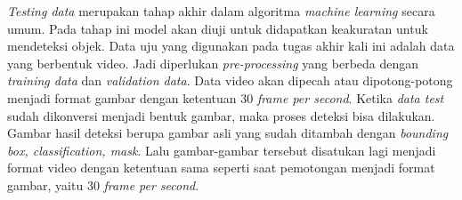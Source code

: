\textit{Testing data} merupakan tahap akhir dalam algoritma \textit{machine learning} secara umum. Pada tahap ini model akan diuji untuk didapatkan keakuratan untuk mendeteksi objek. Data uju yang digunakan pada tugas akhir kali ini adalah data yang berbentuk video. Jadi diperlukan \textit{pre-processing} yang berbeda dengan \textit{training data} dan \textit{validation data}. Data video akan dipecah atau dipotong-potong menjadi format gambar dengan ketentuan 30 \textit{frame per second}. Ketika \textit{data test} sudah dikonversi menjadi bentuk gambar, maka proses deteksi bisa dilakukan. Gambar hasil deteksi berupa gambar asli yang sudah ditambah dengan \textit{bounding box, classification, mask}. Lalu gambar-gambar tersebut disatukan lagi menjadi format video dengan ketentuan sama seperti saat pemotongan menjadi format gambar, yaitu 30 \textit{frame per second}. 

%
%
%
%
%
%
%
